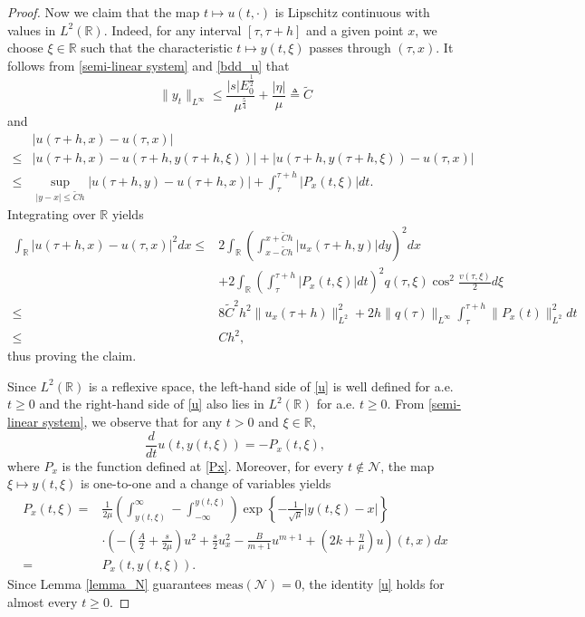 \documentclass[10pt]{article}
\numberwithin{equation}{section}
\begin{document}
\begin{proof}
		Now we claim that the map $t\mapsto u(t,\cdot)$ is Lipschitz continuous with values in $L^2(\mathbb{R})$. Indeed, for any interval $[\tau,\tau+h]$ and a given point $x$, we choose $\xi\in\mathbb{R}$ such that the characteristic $t\mapsto y(t,\xi)$ passes through $(\tau,x)$. It follows from \eqref{semi-linear system} and \eqref{bdd_u} that 
		$$\|y_t\|_{L^\infty}\leq\frac{|s|E_0^{\frac{1}{2}}}{\mu^{\frac{5}{4}}}+\frac{|\eta|}{\mu}\triangleq\widetilde{C}$$
		and 
		\begin{align*}
			&\left|u(\tau+h,x)-u(\tau,x)\right|\\
			\leq&\left|u(\tau+h,x)-u\left(\tau+h,y(\tau+h,\xi)\right)\right|  +\left|u\left(\tau+h,y(\tau+h,\xi)\right)-u(\tau,x)\right| \\
			\leq&\sup_{|y-x|\leq \widetilde{C}h}\left|u(\tau+h,y)-u(\tau+h,x)\right|+\int_{\tau}^{\tau+h}\left|P_{x}(t,\xi)\right|dt.
		\end{align*}
		Integrating over $\mathbb{R}$ yields
		\begin{align*}
			\int_\mathbb{R}\left|u(\tau+h,x)-u(\tau,x)\right|^2dx\leq&2\int_\mathbb{R}\left(\int_{x-\widetilde{C}h}^{x+\widetilde{C}h}\left|u_x(\tau+h,y)\right|dy\right)^2dx\\
			&+2\int_\mathbb{R}\left(\int_\tau^{\tau+h}\left|P_x(t,\xi)\right|dt\right)^2q(\tau,\xi)\cos^2\frac{v(\tau,\xi)}{2}d\xi\\
			\leq&8\widetilde{C}^2h^2\|u_x(\tau+h)\|_{L^2}^2+2h\|q(\tau)\|_{L^\infty}\int_\tau^{\tau+h}\|P_x(t)\|_{L^2}^2dt\\
			\leq&Ch^2,
		\end{align*}
		thus proving the claim.
		
		Since $L^2(\mathbb{R})$ is a reflexive space, the left-hand side of \eqref{u} is well defined for a.e. $t\geq0$ and the right-hand side of \eqref{u} also lies in $L^2(\mathbb{R})$ for a.e. $t\geq0$. From \eqref{semi-linear system}, we observe that for any $t>0$ and $\xi\in\mathbb{R}$,
		$$\frac{d}{dt}u\left(t,y(t,\xi)\right)=-P_x(t,\xi),$$
		where $P_x$ is the function defined at \eqref{Px}. Moreover, for every $t\notin\mathcal{N}$, the map $\xi\mapsto y(t,\xi)$ is one-to-one and a
		change of variables yields
		\begin{align*}
			P_x(t,\xi) 
			=&\frac{1}{2\mu}\left(\int_{y(t,\xi)}^{\infty}-\int_{-\infty}^{y(t,\xi)}\right)\exp\left\{-\frac{1}{\sqrt{\mu}}\left|y(t,\xi)-x\right|\right\}\\
			&\cdot\left(-\left(\frac{A}{2}+\frac{s}{2\mu}\right)u^2+\frac{s}{2}u_x^2-\frac{B}{m+1}u^{m+1}+\left(2k+\frac{\eta}{\mu}\right)u\right)(t,x)dx\\
			=&P_x(t,y(t,\xi)).
		\end{align*}
		Since Lemma \ref{lemma_N} guarantees $\mathrm{meas}(\mathcal{N})=0$, the identity \eqref{u} holds for almost every $t\geq0$.
		

\end{proof}
\end{document}
